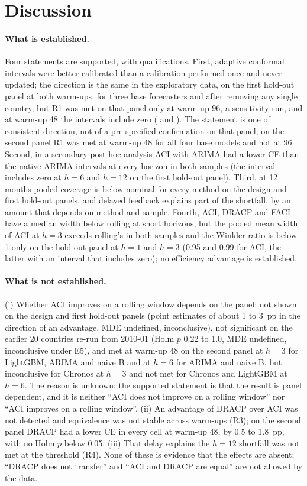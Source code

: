 \section{Discussion}\label{sec:discussion}

\paragraph{What is established.} Four statements are supported, with qualifications. First, adaptive conformal intervals were better calibrated than a calibration performed once and never updated; the direction is the same in the exploratory data, on the first hold-out panel at both warm-ups, for three base forecasters and after removing any single country, but R1 was met on that panel only at warm-up 96, a sensitivity run, and at warm-up 48 the intervals include zero ( and ). The statement is one of consistent direction, not of a pre-specified confirmation on that panel; on the second panel R1 was met at warm-up 48 for all four base models and not at 96. Second, in a secondary post hoc analysis ACI with ARIMA had a lower CE than the native ARIMA intervals at every horizon in both samples (the interval includes zero at $h=6$ and $h=12$ on the first hold-out panel). Third, at 12 months pooled coverage is below nominal for every method on the design and first hold-out panels, and delayed feedback explains part of the shortfall, by an amount that depends on method and sample. Fourth, ACI, DRACP and FACI have a median width below rolling at short horizons, but the pooled mean width of ACI at $h=3$ exceeds rolling's in both samples and the Winkler ratio is below 1 only on the hold-out panel at $h=1$ and $h=3$ (0.95 and 0.99 for ACI, the latter with an interval that includes zero); no efficiency advantage is established.

\paragraph{What is not established.} (i) Whether ACI improves on a rolling window depends on the panel: not shown on the design and first hold-out panels (point estimates of about 1 to 3~pp in the direction of an advantage, MDE undefined, inconclusive), not significant on the earlier 20 countries re-run from 2010-01 (Holm $p$ 0.22 to 1.0, MDE undefined, inconclusive under E5), and met at warm-up 48 on the second panel at $h=3$ for LightGBM, ARIMA and naive B and at $h=6$ for ARIMA and naive B, but inconclusive for Chronos at $h=3$ and not met for Chronos and LightGBM at $h=6$. The reason is unknown; the supported statement is that the result is panel dependent, and it is neither ``ACI does not improve on a rolling window'' nor ``ACI improves on a rolling window''. (ii) An advantage of DRACP over ACI was not detected and equivalence was not stable across warm-ups (R3); on the second panel DRACP had a lower CE in every cell at warm-up 48, by 0.5 to 1.8~pp, with no Holm $p$ below 0.05. (iii) That delay explains the $h=12$ shortfall was not met at the threshold (R4). None of these is evidence that the effects are absent; ``DRACP does not transfer'' and ``ACI and DRACP are equal'' are not allowed by the data.


